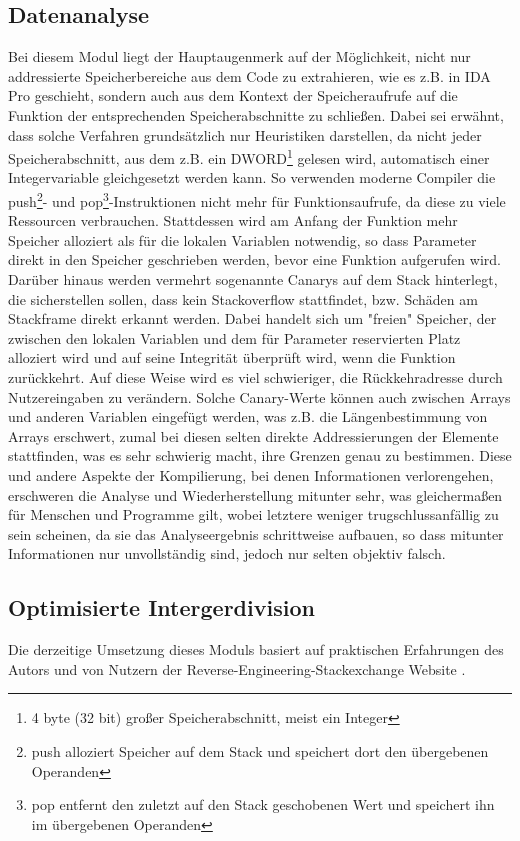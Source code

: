 \documentclass[11pt]{article} %
\begin{document}
\subsection{Datenanalyse}
Bei diesem Modul liegt der Hauptaugenmerk auf der Möglichkeit, nicht nur
addressierte Speicherbereiche aus dem Code zu extrahieren, wie es z.B. in IDA Pro
geschieht, sondern auch aus dem Kontext der Speicheraufrufe auf die Funktion der entsprechenden
Speicherabschnitte zu schließen. Dabei sei erwähnt, dass solche Verfahren grundsätzlich nur
Heuristiken darstellen, da nicht jeder Speicherabschnitt, aus dem z.B. ein DWORD\footnote{4 byte (32
bit) großer Speicherabschnitt, meist ein Integer} gelesen wird, automatisch einer Integervariable
gleichgesetzt werden kann. So verwenden moderne Compiler die push\footnote{push alloziert Speicher
auf dem Stack und speichert dort den übergebenen Operanden}- und pop\footnote{pop entfernt den
zuletzt auf den Stack geschobenen Wert und speichert ihn im übergebenen Operanden}-Instruktionen
nicht mehr für Funktionsaufrufe, da diese zu viele Ressourcen verbrauchen. Stattdessen wird am
Anfang der Funktion mehr Speicher alloziert als für die lokalen Variablen notwendig, so dass
Parameter direkt in den Speicher geschrieben werden, bevor eine Funktion aufgerufen wird. Darüber
hinaus werden vermehrt sogenannte Canarys auf dem Stack hinterlegt, die sicherstellen sollen, dass
kein Stackoverflow stattfindet, bzw. Schäden am Stackframe direkt erkannt werden.
Dabei handelt sich um "freien" Speicher, der zwischen den lokalen
Variablen und dem für Parameter reservierten Platz alloziert wird und auf seine Integrität überprüft
wird, wenn die Funktion zurückkehrt. Auf diese Weise wird es viel schwieriger, die Rückkehradresse
durch Nutzereingaben zu verändern. Solche Canary-Werte können auch zwischen Arrays und anderen
Variablen eingefügt werden, was z.B. die Längenbestimmung von Arrays erschwert, zumal bei diesen
selten direkte Addressierungen der Elemente stattfinden, was es sehr schwierig macht, ihre Grenzen
genau zu bestimmen. Diese und andere Aspekte der Kompilierung, bei denen Informationen verlorengehen,
erschweren die Analyse und Wiederherstellung mitunter sehr, was gleichermaßen für Menschen und
Programme gilt, wobei letztere weniger trugschlussanfällig zu sein scheinen, da sie das Analyseergebnis
schrittweise aufbauen, so dass mitunter Informationen nur unvollständig sind, jedoch nur selten objektiv falsch.

\subsection{Optimisierte Intergerdivision} Die derzeitige Umsetzung dieses Moduls basiert auf
praktischen Erfahrungen des Autors und von Nutzern der Reverse-Engineering-Stackexchange
Website \cite{stackexchange:4}.
\end{document}
